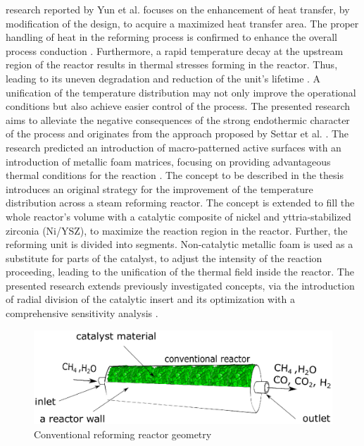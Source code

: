 \documentclass[preprint,12pt]{elsarticle}
\begin{document}
research reported by Yun et al. \cite{Yun2019}  focuses on the enhancement of heat transfer, by modification of the design, to acquire a maximized heat transfer area. The proper handling of heat in the reforming process is confirmed to enhance the overall process conduction \cite{Dubinin2018}.  Furthermore, a rapid temperature decay at the upstream region of the reactor results in thermal stresses forming in the reactor. Thus, leading to its uneven degradation and reduction of the unit's lifetime \cite{Mozdzierz2016}. A unification of the temperature distribution may not only improve the operational conditions but also achieve easier control of the process. The presented research aims to alleviate the negative consequences of the strong endothermic character of the process and originates from the approach proposed by Settar et al. \cite{Settar2017}. The research predicted an introduction of macro-patterned active surfaces with an introduction of metallic foam matrices, focusing on providing advantageous thermal conditions for the reaction \cite{Settar2018a, Settar2018c}.  The concept to be described in the thesis introduces an original strategy for the improvement of the temperature distribution across a steam reforming reactor. The concept is extended to fill the whole reactor's volume with a catalytic composite of nickel and yttria-stabilized zirconia (Ni/YSZ), to maximize the reaction region in the reactor. Further, the reforming unit is divided into segments. Non-catalytic metallic foam is used as a substitute for parts of the catalyst, to adjust the intensity of the reaction proceeding, leading to the unification of the thermal field inside the reactor. The presented research extends previously investigated concepts, via the introduction of radial division of the catalytic insert and its optimization with a comprehensive sensitivity analysis \cite{Pajak2021IJHEb}. 


\begin{figure}[h!]
\centering
\includegraphics[width=190mm]{conventional-reactor.eps}
\caption{\label{fig:conv_reactor}{Conventional reforming reactor geometry}}
\end{figure}
\end{document}
